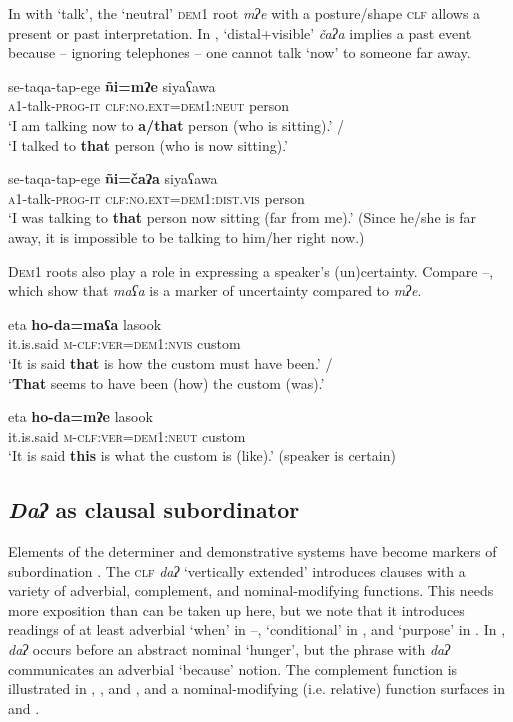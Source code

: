 \documentclass[output=paper,colorlinks,citecolor=brown]{langscibook}
\begin{document}
In  with ‘talk’, the ‘neutral’ \textsc{dem1} root \textit{mʔe} with a posture/shape \textsc{clf} allows a present or past interpretation. In , ‘distal+visible’ \textit{čaʔa} implies a past event because – ignoring telephones – one cannot talk ‘now’ to someone far away.

\ea\label{ex:payne:80}
\gll  se-taqa-tap-ege  \textbf{ñi=mʔe}  siyaʕawa\\
 \textsc{a1}-talk-\textsc{prog-it}  \textsc{clf:no.ext=dem1:neut} person\\
\glt ‘I am talking now to \textbf{a/that} person (who is sitting).’ /\\
‘I talked to \textbf{that} person (who is now sitting).’
\z

\ea\label{ex:payne:81}
\gll  se-taqa-tap-ege  \textbf{ñi=čaʔa}  siyaʕawa\\
 \textsc{a1}-talk-\textsc{prog-it}  \textsc{clf:no.ext=dem1:dist.vis} person\\
\glt ‘I was talking to \textbf{that} person now sitting (far from me).’ (Since he/she is far away, it is impossible to be talking to him/her right now.)
\z

\textsc{Dem}1 roots also play a role in expressing a speaker’s (un)certainty. Compare –, which show that \textit{maʕa} is a marker of uncertainty compared to \textit{mʔe}.

\ea\label{ex:payne:82}
\gll  eta  \textbf{ho-da=maʕa}  lasook\\
it.is.said \textsc{m-clf:ver=dem1:nvis} custom\\
\glt ‘It is said \textbf{that} is how the custom must have been.’ /\\
‘\textbf{That} seems to have been (how) the custom (was).’
\z

\ea\label{ex:payne:83}
\gll  eta  \textbf{ho-da=mʔe}  lasook\\
it.is.said \textsc{m-clf:ver=dem1:neut} custom\\
\glt ‘It is said \textbf{this} is what the custom is (like).’ (speaker is certain)
\z

 \subsection{\textit{Daʔ} as clausal subordinator}\label{sec:payne:7.3}

Elements of the determiner and demonstrative systems have become markers of subordination \citep{Vidal2001}. The \textsc{clf} \textit{daʔ} ‘vertically extended’ introduces clauses with a variety of adverbial, complement, and nominal-modifying functions. This needs more exposition than can be taken up here, but we note that it introduces readings of at least adverbial ‘when’ in –, ‘conditional’ in , and ‘purpose’ in . In , \textit{daʔ} occurs before an abstract nominal ‘hunger’, but the phrase with \textit{daʔ} communicates an adverbial ‘because’ notion. The complement function is illustrated in , , and , and a nominal-modifying (i.e. relative) function surfaces in  and .
\end{document}
